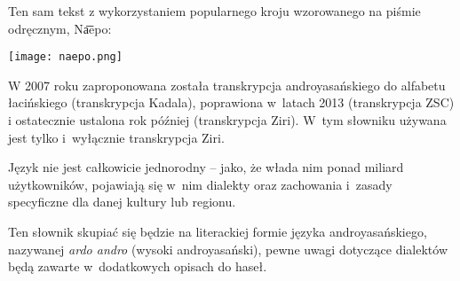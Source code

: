 \skipline

Ten sam tekst z wykorzystaniem popularnego kroju wzorowanego na piśmie
odręcznym, Na͞epo:

\begin{center}
    \texttt{[image: naepo.png]}
\end{center}

W 2007 roku zaproponowana została transkrypcja androyasańskiego do alfabetu 
łacińskiego (transkrypcja Kadala), poprawiona w~latach 2013 (transkrypcja 
ZSC) i ostatecznie ustalona rok później (transkrypcja Ziri). W~tym słowniku
używana jest tylko i~wyłącznie transkrypcja Ziri.

Język nie jest całkowicie jednorodny -- jako, że włada nim ponad miliard 
użytkowników, pojawiają się w~nim dialekty oraz zachowania i~zasady specyficzne 
dla danej kultury lub regionu. 

Ten słownik skupiać się będzie na literackiej formie języka androyasańskiego,
nazywanej \emph{ardo andro} (wysoki androyasański), pewne uwagi dotyczące
dialektów będą zawarte w~dodatkowych opisach do haseł.